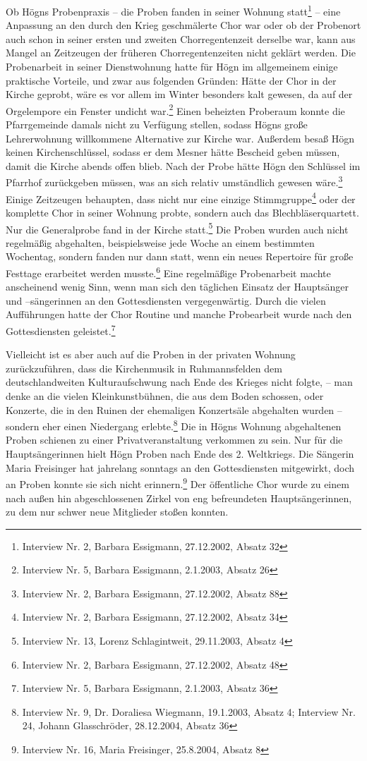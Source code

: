 \documentclass[a4paper]{article}
\begin{document}
Ob Högns Probenpraxis – die Proben fanden in seiner Wohnung
statt\footnote{ Interview Nr. 2, Barbara Essigmann, 27.12.2002, Absatz
32} – eine Anpassung an den durch den Krieg geschmälerte Chor war oder
ob der Probenort auch schon in seiner ersten und zweiten
Chorregentenzeit derselbe war, kann aus Mangel an Zeitzeugen der
früheren Chorregentenzeiten nicht geklärt werden. Die Probenarbeit in
seiner Dienstwohnung hatte für Högn im allgemeinem einige praktische
Vorteile, und zwar aus folgenden Gründen: Hätte der Chor in der Kirche
geprobt, wäre es vor allem im Winter besonders kalt gewesen, da auf der
Orgelempore ein Fenster undicht war.\footnote{ Interview Nr. 5, Barbara
Essigmann, 2.1.2003, Absatz 26} Einen beheizten Proberaum konnte die
Pfarrgemeinde damals nicht zu Verfügung stellen, sodass Högns große
Lehrerwohnung willkommene Alternative zur Kirche war. Außerdem besaß
Högn keinen Kirchenschlüssel, sodass er dem Mesner hätte Bescheid geben
müssen, damit die Kirche abends offen blieb. Nach der Probe hätte Högn
den Schlüssel im Pfarrhof zurückgeben müssen, was an sich relativ
umständlich gewesen wäre.\footnote{ Interview Nr. 2, Barbara Essigmann,
27.12.2002, Absatz 88} Einige Zeitzeugen behaupten, dass nicht nur eine
einzige Stimmgruppe\footnote{ Interview Nr. 2, Barbara Essigmann,
27.12.2002, Absatz 34} oder der komplette Chor in seiner Wohnung
probte, sondern auch das Blechbläserquartett. Nur die Generalprobe fand
in der Kirche statt.\footnote{ Interview Nr. 13, Lorenz Schlagintweit,
29.11.2003, Absatz 4} Die Proben wurden auch nicht regelmäßig
abgehalten, beispielsweise jede Woche an einem bestimmten Wochentag,
sondern fanden nur dann statt, wenn ein neues Repertoire für große
Festtage erarbeitet werden musste.\footnote{ Interview Nr. 2, Barbara
Essigmann, 27.12.2002, Absatz 48} Eine regelmäßige Probenarbeit machte
anscheinend wenig Sinn, wenn man sich den täglichen Einsatz der
Hauptsänger und –sängerinnen an den Gottesdiensten vergegenwärtig.
Durch die vielen Aufführungen hatte der Chor Routine und manche
Probearbeit wurde nach den Gottesdiensten geleistet.\footnote{
Interview Nr. 5, Barbara Essigmann, 2.1.2003, Absatz 36} 

Vielleicht ist es aber auch auf die Proben in der privaten Wohnung
zurückzuführen, dass die Kirchenmusik in Ruhmannsfelden dem
deutschlandweiten Kulturaufschwung nach Ende des Krieges nicht folgte,
– man denke an die vielen Kleinkunstbühnen, die aus dem Boden schossen,
oder Konzerte, die in den Ruinen der ehemaligen Konzertsäle abgehalten
wurden – sondern eher einen Niedergang erlebte.\footnote{ Interview Nr.
9, Dr. Doraliesa Wiegmann, 19.1.2003, Absatz 4; Interview Nr. 24,
Johann Glasschröder, 28.12.2004, Absatz 36} Die in Högns Wohnung
abgehaltenen Proben schienen zu einer Privatveranstaltung verkommen zu
sein. Nur für die Hauptsängerinnen hielt Högn Proben nach Ende des 2.
Weltkriegs. Die Sängerin Maria Freisinger hat jahrelang sonntags an den
Gottesdiensten mitgewirkt, doch an Proben konnte sie sich nicht
erinnern.\footnote{ Interview Nr. 16, Maria Freisinger, 25.8.2004,
Absatz 8} Der öffentliche Chor wurde zu einem nach außen hin
abgeschlossenen Zirkel von eng befreundeten Hauptsängerinnen, zu dem
nur schwer neue Mitglieder stoßen konnten.
\end{document}
